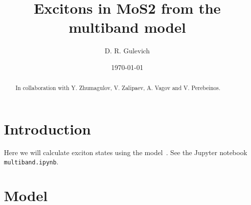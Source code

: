 \documentclass[
aps,
prl,
groupedaddress,
superscriptaddress,
floatfix,
notitlepage
]{revtex4-1}
\begin{document}
	

\title{Excitons in MoS2 from the multiband model}

\author{D. R. Gulevich} 

\date{\today}

\begin{abstract} 
In collaboration with Y. Zhumagulov, V. Zalipaev, A. Vagov and V. Perebeinos.
\end{abstract}

{\let\newpage\relax\maketitle}

\section{Introduction}

Here we will calculate exciton states using the model~\cite{Peeters-PRB-2017}. 
See the Jupyter notebook \verb|multiband.ipynb|.

\section{Model}
\end{document}
